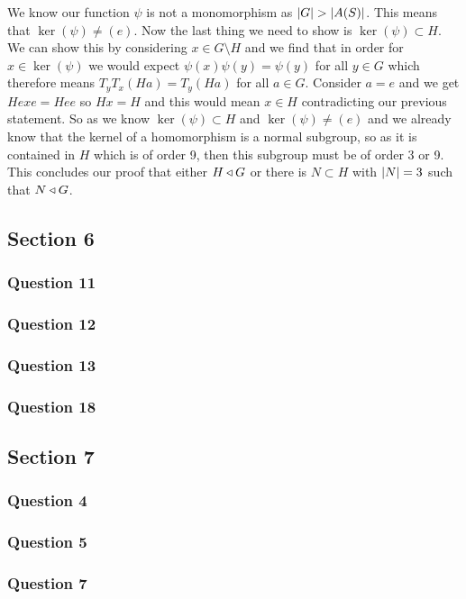 \documentclass{article}
\begin{document}
We know our function $\psi$ is not a monomorphism as $\left| {G} \right| > \left| {A(S)} \right|$. This means that $\ker(\psi) \not= (e)$. Now the last thing we need to show is $\ker(\psi) \subset H$. We can show this by considering $x \in G \setminus H$ and we find that in order for $x\in \ker(\psi)$ we would expect $\psi(x)\psi(y) = \psi(y)$ for all $y\in G$ which therefore means $T_yT_x(Ha) = T_y(Ha)$ for all $a \in G$. Consider $a = e$ and we get $Hexe = Hee$ so $Hx = H$ and this would mean $x \in H$ contradicting our previous statement. So as we know $\ker(\psi) \subset H$ and $\ker(\psi) \not= (e)$ and we already know that the kernel of a homomorphism is a normal subgroup, so as it is contained in $H$ which is of order 9, then this subgroup must be of order 3 or 9. This concludes our proof that either $H\triangleleft G$ or there is $N \subset H$ with $\left| {N} \right| = 3$ such that $N \triangleleft G$.

\subsection{Section 6}
\subsubsection{Question 11}
\subsubsection{Question 12}
\subsubsection{Question 13}
\subsubsection{Question 18}

\subsection{Section 7}
\subsubsection{Question 4}
\subsubsection{Question 5}
\subsubsection{Question 7}
\end{document}
